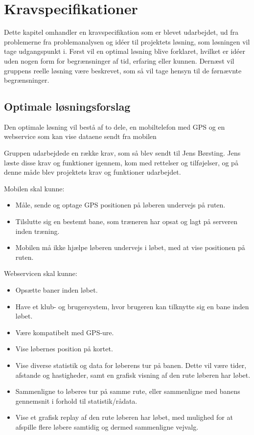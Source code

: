\chapter{Kravspecifikationer}
Dette kapitel omhandler en kravspecifikation som er blevet udarbejdet, ud fra problemerne fra problemanalysen og idéer til projektets løsning, som løsningen vil tage udgangspunkt i. Først vil en optimal løsning blive forklaret, hvilket er idéer uden nogen form for begrænsninger af tid, erfaring eller kunnen. Dernæst vil gruppens reelle løsning være beskrevet, som så vil tage hensyn til de førnævnte begrænsninger.

\section{Optimale løsningsforslag}
Den optimale løsning vil bestå af to dele, en mobiltelefon med GPS og en webservice som kan vise dataene sendt fra mobilen

Gruppen udarbejdede en række krav, som så blev sendt til Jens Børsting. Jens læste disse krav og funktioner igennem, kom med rettelser og tilføjelser, og på denne måde blev projektets krav og funktioner udarbejdet. 

Mobilen skal kunne:
\begin{itemize}
	\item Måle, sende og optage GPS positionen på løberen undervejs på ruten.
	\item Tilslutte sig en bestemt bane, som træneren har opsat og lagt på serveren inden træning.
	\item Mobilen må ikke hjælpe løberen undervejs i løbet, med at vise positionen på ruten.
\end{itemize}

Webservicen skal kunne:
\begin{itemize}
	\item Opsætte baner inden løbet.
	\item Have et klub- og brugersystem, hvor brugeren kan tilknytte sig en bane inden løbet.
	\item Være kompatibelt med GPS-ure.
	\item Vise løbernes position på kortet.
	\item Vise diverse statistik og data for løberens tur på banen. Dette vil være tider, afstande og hastigheder, samt en grafisk visning af den rute løberen har løbet.
	\item Sammenligne to løberes tur på samme rute, eller sammenligne med banens gennemsnit i forhold til statistik/rådata.
	\item Vise et grafisk replay af den rute løberen har løbet, med mulighed for at afspille flere løbere samtidig og dermed sammenligne vejvalg.
\end{itemize} 

